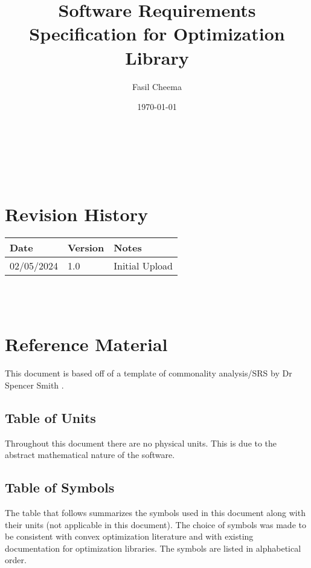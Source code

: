 \documentclass[12pt]{article}
\begin{document}
\title{Software Requirements Specification for Optimization Library} 
\author{Fasil Cheema}
\date{\today}
	
\maketitle

~\newpage


\tableofcontents

~\newpage

\section*{Revision History}

\begin{tabularx}{\textwidth}{p{3cm}p{2cm}X}
\toprule {\bf Date} & {\bf Version} & {\bf Notes}\\
\midrule
02/05/2024 & 1.0 & Initial Upload\\
\bottomrule
\end{tabularx}

~\\

~\newpage

\section{Reference Material}

This document is based off of a template of commonality analysis/SRS by Dr Spencer Smith \citep{Ssmith}.

\subsection{Table of Units}

Throughout this document there are no physical units. This is due to the abstract mathematical nature of the software. 

\subsection{Table of Symbols}

The table that follows summarizes the symbols used in this document along with
their units (not applicable in this document).  The choice of symbols was made to be consistent with convex optimization literature and with existing documentation for optimization libraries.  The symbols are listed in alphabetical order.
\end{document}
